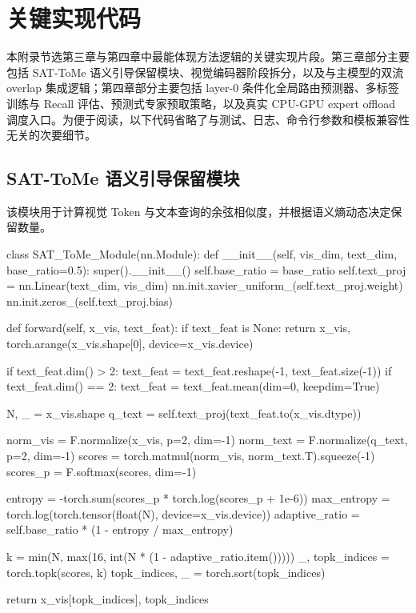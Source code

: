 \chapter{关键实现代码}

本附录节选第三章与第四章中最能体现方法逻辑的关键实现片段。第三章部分主要包括 SAT-ToMe 语义引导保留模块、视觉编码器阶段拆分，以及与主模型的双流 overlap 集成逻辑；第四章部分主要包括 layer-0 条件化全局路由预测器、多标签训练与 Recall 评估、预测式专家预取策略，以及真实 CPU-GPU expert offload 调度入口。为便于阅读，以下代码省略了与测试、日志、命令行参数和模板兼容性无关的次要细节。


\section{SAT-ToMe 语义引导保留模块}
该模块用于计算视觉 Token 与文本查询的余弦相似度，并根据语义熵动态决定保留数量。
\begin{CodeBlock}
class SAT_ToMe_Module(nn.Module):
    def __init__(self, vis_dim, text_dim, base_ratio=0.5):
        super().__init__()
        self.base_ratio = base_ratio
        self.text_proj = nn.Linear(text_dim, vis_dim)
        nn.init.xavier_uniform_(self.text_proj.weight)
        nn.init.zeros_(self.text_proj.bias)

    def forward(self, x_vis, text_feat):
        if text_feat is None:
            return x_vis, torch.arange(x_vis.shape[0], device=x_vis.device)

        if text_feat.dim() > 2:
            text_feat = text_feat.reshape(-1, text_feat.size(-1))
        if text_feat.dim() == 2:
            text_feat = text_feat.mean(dim=0, keepdim=True)

        N, _ = x_vis.shape
        q_text = self.text_proj(text_feat.to(x_vis.dtype))

        norm_vis = F.normalize(x_vis, p=2, dim=-1)
        norm_text = F.normalize(q_text, p=2, dim=-1)
        scores = torch.matmul(norm_vis, norm_text.T).squeeze(-1)
        scores_p = F.softmax(scores, dim=-1)

        entropy = -torch.sum(scores_p * torch.log(scores_p + 1e-6))
        max_entropy = torch.log(torch.tensor(float(N), device=x_vis.device))
        adaptive_ratio = self.base_ratio * (1 - entropy / max_entropy)

        k = min(N, max(16, int(N * (1 - adaptive_ratio.item()))))
        _, topk_indices = torch.topk(scores, k)
        topk_indices, _ = torch.sort(topk_indices)

        return x_vis[topk_indices], topk_indices
\end{CodeBlock}

